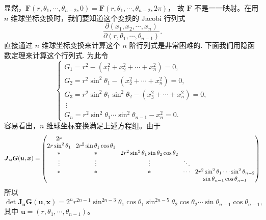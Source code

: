 显然，$\boldsymbol{F}(r, \theta_1, \cdots, \theta_{n-2}, 0) = \boldsymbol{F}(r, \theta_1, \cdots, \theta_{n-2}, 2\pi)$，
故 $\boldsymbol{F}$ 不是一一映射。在用 $n$ 维球坐标变换时，我们要知道这个变换的 Jacobi 行列式
\[
\frac{\partial(x_1, x_2, \cdots, x_n)}{\partial(r, \theta_1, \cdots, \theta_{n-1})}.
\]
直接通过 $n$ 维球坐标变换来计算这个 $n$ 阶行列式是非常困难的. 下面我们用隐函数定理来计算这个行列式. 为此令
\[
\begin{cases}
G_1 = r^2 - (x_1^2 + x_2^2 + \cdots + x_n^2) = 0,\\
G_2 = r^2 \sin^2\theta_1 - (x_2^2 + \cdots + x_n^2) = 0,\\
G_3 = r^2 \sin^2\theta_1 \sin^2\theta_2 - (x_3^2 + \cdots + x_n^2) = 0,\\
\ \vdots\\
G_n = r^2 \sin^2\theta_1 \cdots \sin^2\theta_{n-1} - x_n^2 = 0.
\end{cases}
\]
容易看出，$n$ 维球坐标变换满足上述方程组。由于
\[
\boldsymbol{J}_{\boldsymbol{u}}\boldsymbol{G}(\boldsymbol{u}, \boldsymbol{x}) =
{\scriptstyle\setlength{\arraycolsep}{4pt}
\begin{pmatrix}
2r & & & & \\
2r\sin^2\theta_1 & 2r^2 \sin\theta_1 \cos\theta_1 & & & \\
* & * & 2r^2 \sin^2\theta_1 \sin\theta_2 \cos\theta_2 & & \\
\vdots & \vdots & \vdots & \ddots & \\
* & * & * & \cdots & 2r^2 \sin^2\theta_1 \cdots \sin^2\theta_{n-2} \\
& & & & \sin\theta_{n-1} \cos\theta_{n-1}
\end{pmatrix}}
\]
所以
\[
\det \boldsymbol{J}_{\boldsymbol{u}}\boldsymbol{G}(\boldsymbol{u}, \boldsymbol{x})
= 2^n r^{2n-1} \sin^{2n-3}\theta_1 \cos\theta_1 \sin^{2n-5}\theta_2 \cos\theta_2
  \cdots \sin\theta_{n-1} \cos\theta_{n-1},
\]
其中 $\boldsymbol{u} = (r, \theta_1, \cdots, \theta_{n-1})$。

